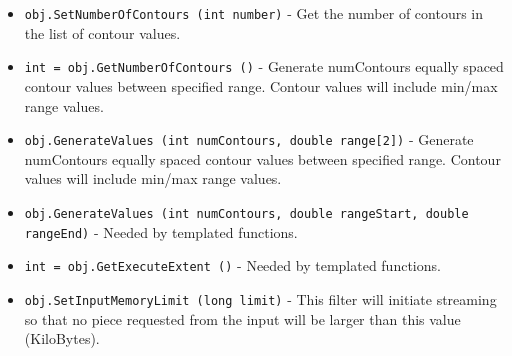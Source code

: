 \begin{itemize}
\item  \verb|obj.SetNumberOfContours (int number)| -  Get the number of contours in the list of contour values.

\item  \verb|int = obj.GetNumberOfContours ()| -  Generate numContours equally spaced contour values between specified
 range. Contour values will include min/max range values.

\item  \verb|obj.GenerateValues (int numContours, double range[2])| -  Generate numContours equally spaced contour values between specified
 range. Contour values will include min/max range values.

\item  \verb|obj.GenerateValues (int numContours, double rangeStart, double rangeEnd)| -  Needed by templated functions.

\item  \verb|int = obj.GetExecuteExtent ()| -  Needed by templated functions.

\item  \verb|obj.SetInputMemoryLimit (long limit)| -  This filter will initiate streaming so that no piece requested
 from the input will be larger than this value (KiloBytes).

\end{itemize}
